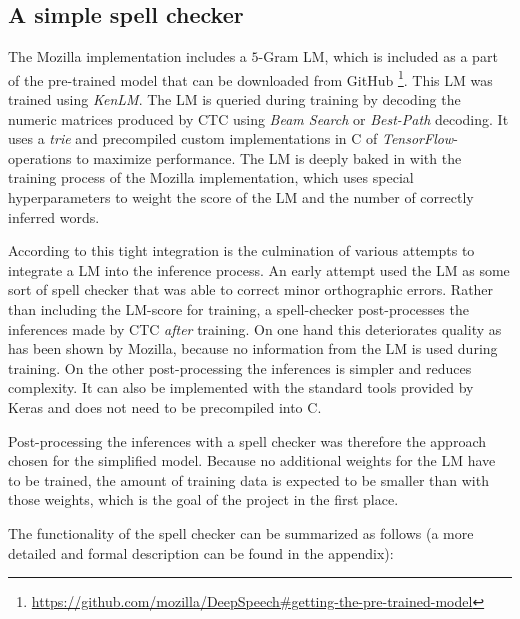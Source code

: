 \subsection{A simple spell checker}

The Mozilla implementation includes a $5$-Gram \ac{LM}, which is included as a part of the pre-trained model that can be downloaded from GitHub \footnote{\url{https://github.com/mozilla/DeepSpeech\#getting-the-pre-trained-model}}. This \ac{LM} was trained using \textit{KenLM}. The \ac{LM} is queried during training by decoding the numeric matrices produced by \ac{CTC} using \textit{Beam Search} or \textit{Best-Path} decoding. It uses a \textit{trie} and precompiled custom implementations in C of \textit{TensorFlow}-operations to maximize performance. The \ac{LM} is deeply baked in with the training process of the Mozilla implementation, which uses special hyperparameters to weight the score of the \ac{LM} and the number of correctly inferred words.

According to \cite{mozillajourney} this tight integration is the culmination of various attempts to integrate a \ac{LM} into the inference process. An early attempt used the \ac{LM} as some sort of spell checker that was able to correct minor orthographic errors. Rather than including the \ac{LM}-score for training, a spell-checker post-processes the inferences made by \ac{CTC} \textit{after} training. On one hand this deteriorates quality as has been shown by Mozilla, because no information from the \ac{LM} is used during training. On the other post-processing the inferences is simpler and reduces complexity. It can also be implemented with the standard tools provided by Keras and does not need to be precompiled into C. 

Post-processing the inferences with a spell checker was therefore the approach chosen for the simplified model. Because no additional weights for the \ac{LM} have to be trained, the amount of training data is expected to be smaller than with those weights, which is the goal of the project in the first place.

The functionality of the spell checker can be summarized as follows (a more detailed and formal description can be found in the appendix): 

